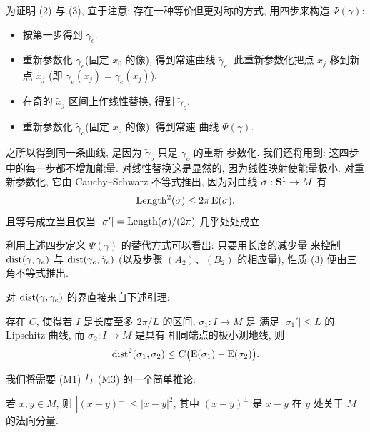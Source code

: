 为证明 (2) 与 (3), 宜于注意: 存在一种等价但更对称的方式, 用四步来构造
$\Psi(\gamma)$:

\begin{itemize}[leftmargin=2.6em,itemsep=1pt,topsep=2pt]
\item[$(A_1)$] 按第一步得到 $\gamma_e$.
\item[$(B_1)$] 重新参数化 $\gamma_e$(固定 $x_0$ 的像), 得到常速曲线
      $\tilde{\gamma}_e$. 此重新参数化把点 $x_j$ 移到新点 $\tilde{x}_j$
      (即 $\gamma_e(x_j)=\tilde{\gamma}_e(\tilde{x}_j)$).
\item[$(A_2)$] 在奇的 $\tilde{x}_j$ 区间上作线性替换, 得到
      $\tilde{\gamma}_o$.
\item[$(B_2)$] 重新参数化 $\tilde{\gamma}_o$(固定 $x_0$ 的像), 得到常速
      曲线 $\Psi(\gamma)$.
\end{itemize}

之所以得到同一条曲线, 是因为 $\tilde{\gamma}_o$ 只是 $\gamma_o$ 的重新
参数化. 我们还将用到: 这四步中的每一步都不增加能量. 对线性替换这是显然的,
因为线性映射使能量极小. 对重新参数化, 它由 Cauchy--Schwarz 不等式推出,
因为对曲线 $\sigma:\mathbf{S}^1\to M$ 有
\begin{equation}
\operatorname{Length}^2(\sigma)\leq 2\pi\,\mathrm{E}(\sigma),
\label{eq:5.3}
\end{equation}
且等号成立当且仅当 $|\sigma'|=\operatorname{Length}(\sigma)/(2\pi)$ 几乎处处成立.

利用上述四步定义 $\Psi(\gamma)$ 的替代方式可以看出: 只要用长度的减少量
来控制 $\operatorname{dist}(\gamma,\gamma_e)$ 与 $\operatorname{dist}(\gamma_e,\tilde{\gamma}_e)$
(以及步骤 $(A_2)$、$(B_2)$ 的相应量), 性质 (3) 便由三角不等式推出.

对 $\operatorname{dist}(\gamma,\gamma_e)$ 的界直接来自下述引理:

\begin{lemma}
\label{lem:5.1}
存在 $C$, 使得若 $I$ 是长度至多 $2\pi/L$ 的区间, $\sigma_1:I\to M$ 是
满足 $|\sigma_1'|\leq L$ 的 Lipschitz 曲线, 而 $\sigma_2:I\to M$ 是具有
相同端点的极小测地线, 则
\begin{equation}
\operatorname{dist}^2(\sigma_1,\sigma_2)\leq C\bigl(\mathrm{E}(\sigma_1)
-\mathrm{E}(\sigma_2)\bigr).
\label{eq:5.4}
\end{equation}
\end{lemma}

我们将需要 (M1) 与 (M3) 的一个简单推论:

\begin{lemma}
\label{lem:5.2}
若 $x,y\in M$, 则 $|(x-y)^{\perp}|\leq|x-y|^2$, 其中 $(x-y)^{\perp}$ 是
$x-y$ 在 $y$ 处关于 $M$ 的法向分量.
\end{lemma}

